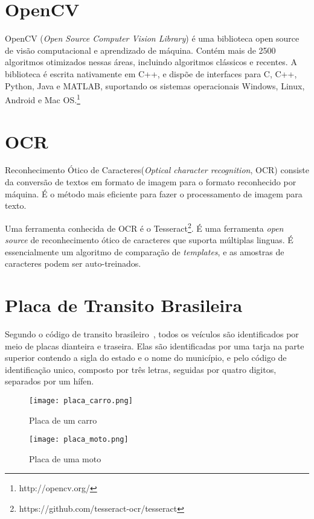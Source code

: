 \section{OpenCV}
\label{sec:opencv}

OpenCV (\emph{Open Source Computer Vision Library}) é uma biblioteca open source de
visão computacional e aprendizado de máquina. Contém mais de 2500 algoritmos
otimizados nessas áreas, incluindo algoritmos clássicos e recentes. A biblioteca
é escrita nativamente em C++, e dispõe de interfaces para C, C++, Python, Java e
MATLAB, suportando os sistemas operacionais Windows, Linux, Android e Mac
OS.\footnote{http://opencv.org/}

\section{OCR}
\label{sec:ocr}

Reconhecimento Ótico de Caracteres(\emph{Optical character recognition}, OCR) consiste da conversão de textos em
formato de imagem para o formato reconhecido por máquina. É o método mais
eficiente para fazer o processamento de imagem para
texto.~\cite{mohit2015designing}

Uma ferramenta conhecida de OCR é o
Tesseract\footnote{https://github.com/tesseract-ocr/tesseract}. É uma ferramenta
\emph{open source} de reconhecimento ótico de caracteres que suporta múltiplas linguas.
É essencialmente um algoritmo de comparação de \emph{templates}, e as amostras de
caracteres podem ser auto-treinados.~\cite{ho2016intelligent}

\section{Placa de Transito Brasileira}

Segundo o código de transito brasileiro~\cite{brasil1997lei}, todos os veículos
são identificados por meio de placas dianteira e traseira. Elas são
identificadas por uma tarja na parte superior contendo a sigla do estado e o
nome do município, e pelo código de identificação unico, composto por três
letras, seguidas por quatro digitos, separados por um hífen. 

\begin{figure}[H]
		\centering
		\texttt{[image: placa\_carro.png]}
		\caption{Placa de um carro}
		\label{fig:placa_carro}
\end{figure}

\begin{figure}[H]
		\centering
		\texttt{[image: placa\_moto.png]}
		\caption{Placa de uma moto}
		\label{fig:placa_moto}
\end{figure}

